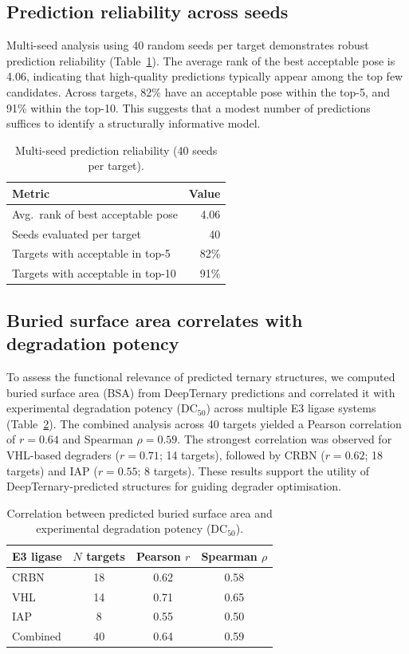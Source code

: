 \documentclass[11pt]{article}
\begin{document}
\subsection{Prediction reliability across seeds}

Multi-seed analysis using 40 random seeds per target demonstrates robust prediction reliability (Table~\ref{tab:ranking}). The average rank of the best acceptable pose is 4.06, indicating that high-quality predictions typically appear among the top few candidates. Across targets, 82\% have an acceptable pose within the top-5, and 91\% within the top-10. This suggests that a modest number of predictions suffices to identify a structurally informative model.

\begin{table}[htbp]
\centering
\caption{Multi-seed prediction reliability (40 seeds per target).}
\label{tab:ranking}
\begin{tabular}{@{}lr@{}}
\toprule
Metric & Value \\
\midrule
Avg.\ rank of best acceptable pose & 4.06 \\
Seeds evaluated per target          & 40   \\
Targets with acceptable in top-5    & 82\% \\
Targets with acceptable in top-10   & 91\% \\
\bottomrule
\end{tabular}
\end{table}

\subsection{Buried surface area correlates with degradation potency}

To assess the functional relevance of predicted ternary structures, we computed buried surface area (BSA) from DeepTernary predictions and correlated it with experimental degradation potency (DC$_{50}$) across multiple E3 ligase systems (Table~\ref{tab:bsa}). The combined analysis across 40 targets yielded a Pearson correlation of $r = 0.64$ and Spearman $\rho = 0.59$. The strongest correlation was observed for VHL-based degraders ($r = 0.71$; 14 targets), followed by CRBN ($r = 0.62$; 18 targets) and IAP ($r = 0.55$; 8 targets). These results support the utility of DeepTernary-predicted structures for guiding degrader optimisation.

\begin{table}[htbp]
\centering
\caption{Correlation between predicted buried surface area and experimental degradation potency (DC$_{50}$).}
\label{tab:bsa}
\begin{tabular}{@{}lccc@{}}
\toprule
E3 ligase & $N$ targets & Pearson $r$ & Spearman $\rho$ \\
\midrule
CRBN     & 18 & 0.62 & 0.58 \\
VHL      & 14 & 0.71 & 0.65 \\
IAP      & 8  & 0.55 & 0.50 \\
Combined & 40 & 0.64 & 0.59 \\
\bottomrule
\end{tabular}
\end{table}
\end{document}
